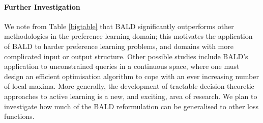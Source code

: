 \documentclass[twoside]{article}
\begin{document}
\paragraph{Further Investigation} We note from Table \ref{bigtable} that BALD significantly outperforms other methodologies in the preference learning domain; this motivates the application of BALD to harder preference learning problems, and domains with more complicated input or output structure. Other possible studies include BALD's application to unconstrained queries in a continuous space, where one must design an efficient optimisation algorithm to cope with an ever increasing number of local maxima. More generally, the development of tractable decision theoretic approaches to active learning is a new, and exciting, area of research. We plan to investigate how much of the BALD reformulation can be generalised to other loss functions.

{\small


}
\end{document}
